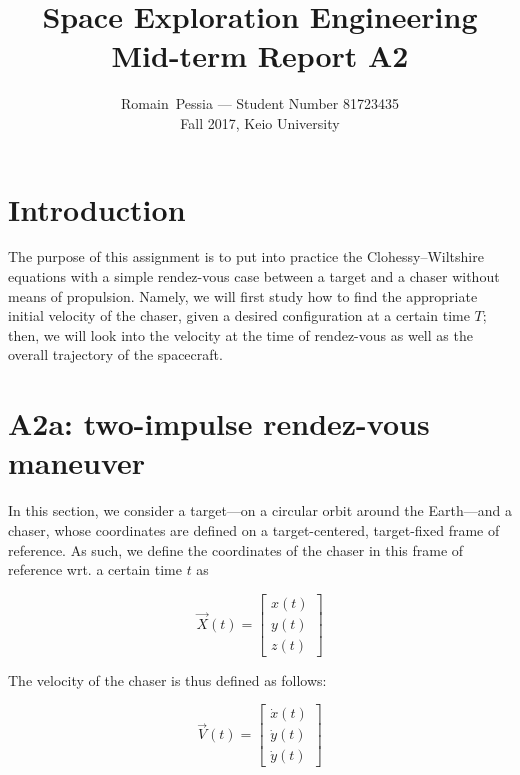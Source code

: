 \documentclass[journal]{IEEEtran}
\begin{document}
\title{Space Exploration Engineering\\
Mid-term Report A2}

\author{Romain~Pessia — Student Number 81723435 \\
Fall 2017, Keio University }%

\maketitle

\section*{Introduction}

The purpose of this assignment is to put into practice the Clohessy–Wiltshire equations with a simple rendez-vous case between a target and a chaser without means of propulsion. Namely, we will first study how to find the appropriate initial velocity of the chaser, given a desired configuration at a certain time $T$; then, we will look into the velocity at the time of rendez-vous as well as the overall trajectory of the spacecraft.

\section*{A2a: two-impulse rendez-vous maneuver}

In this section, we consider a target---on a circular orbit around the Earth---and a chaser, whose coordinates are defined on a target-centered, target-fixed frame of reference. As such, we define the coordinates of the chaser in this frame of reference wrt. a certain time $t$ as

\begin{equation}
    \vec{X}(t) = \begin{bmatrix} x(t)\\
    y(t)\\
    z(t)\end{bmatrix}
\end{equation}

The velocity of the chaser is thus defined as follows:

\begin{equation}
    \vec{V}(t) = \begin{bmatrix} \dot{x}(t)\\
    \dot{y}(t)\\
    \dot{y}(t)\end{bmatrix}
\end{equation}
\end{document}
